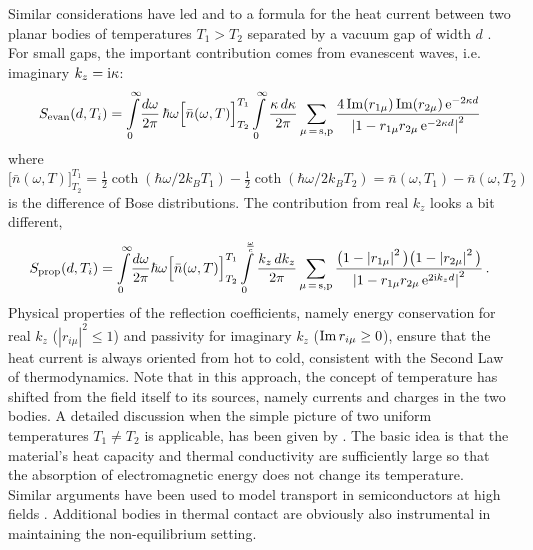 \documentclass[11pt, oneside]{article}   	%
\def\pol{\mu}
\begin{document}
Similar considerations have led \citet{Polder_1971} and \citet{Loomis_1994} 
to a formula for the heat current between two planar bodies of temperatures $T_1 > T_2$ 
separated by a vacuum gap of width $d$ \citep{Volokitin_2017book}. 
For small gaps, the important contribution 
comes from evanescent waves, i.e. imaginary $k_z = {\rm i} \kappa$:
\begin{equation}
    S_{\rm evan} (d, T_i) = \int\limits_0^\infty \! \frac{ d\omega }{ 2\pi }\,
    \hbar \omega \Big[ \bar n( \omega, T ) \Big]^{T_1}_{T_2}
     \int\limits_0^\infty \frac{\kappa\, d\kappa }{2\pi}  
    \sum_{\pol \,=\, {\rm s,p}} 
    \frac{ 4 \mathop{\rm Im}(r_{1\pol}) \mathop{\rm Im}(r_{2\pol}) \,{\rm e}^{-2\kappa d} 
    }{ 
       \left| 1 - r_{1\pol}r_{2\pol} \,{\rm e}^{-2\kappa d} \right|^2
    }
\label{eq:heat-transfer-evan}
\end{equation}
where $\big[ \bar n( \omega, T ) \big]^{T_1}_{T_2} 
= \frac12 \coth(\hbar \omega / 2k_B T_1) - \frac12 \coth(\hbar \omega / 2k_B T_2)
= \bar n( \omega, T_1 ) - \bar n( \omega, T_2 )$
is the difference of Bose distributions. 
The contribution from real $k_z$ looks a bit different,
\begin{equation}
    S_{\rm prop} (d,T_i) = \int\limits_0^\infty \! \frac{d\omega}{2\pi}
\hbar \omega \Big[ \bar n( \omega, T ) \Big]^{T_1}_{T_2}
\int\limits_0^{\frac{\omega}{c}} \frac{k_z\, dk_z }{2\pi}  
\sum_{\pol \,=\, {\rm s,p}} 
\frac{ \big( 1 - \left|r_{1\pol} \right|^2 \big) \big( 1 - \left|r_{2\pol} \right|^2 \big)
}{ 
    \left| 1 - r_{1\pol}r_{2\pol} \,{\rm e}^{2{\rm i} k_z d}   \right|^2 
} \, .
\label{eq:heat-transfer-prop}
\end{equation}
Physical properties of the reflection coefficients, namely energy conservation for real $k_z$
($|r_{i\pol}|^2 \le 1$) 
and passivity for imaginary $k_z$ ($\mathop{\rm Im} r_{i\pol} \ge 0$), ensure that the heat
current is always oriented from hot to cold, consistent with the Second Law of thermodynamics.
Note that in this approach, the concept of temperature has shifted from the field itself
to its sources, namely currents and charges in the two bodies. A detailed discussion when
the simple picture of two uniform temperatures $T_1 \ne T_2$ is applicable, has been given
by \citet{Eckhardt_1982}. The basic idea is that the material's heat capacity and thermal
conductivity are sufficiently large so that the absorption of electromagnetic energy does not
change its temperature. Similar arguments have been used to model transport in 
semiconductors at high fields \citep{Ancona_1995}.
Additional bodies in thermal contact are obviously also instrumental 
in maintaining the non-equilibrium setting.
\end{document}
